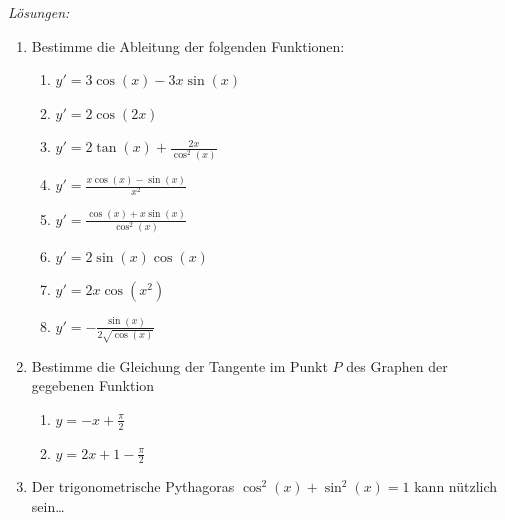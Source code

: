 \clearpage
\emph{Lösungen:}
\begin{enumerate}
	\item Bestimme die Ableitung der folgenden Funktionen:
	      \begin{enumerate}
		      \item $y' = 3\cos(x) - 3x\sin(x)$
		      \item $y' = 2\cos(2x)$
		      \item $y' = 2\tan(x) + \frac{2x}{\cos^2(x)}$
		      \item $y' = \frac{x\cos(x)-\sin(x)}{x^2}$
		      \item $y' = \frac{\cos(x)+x\sin(x)}{\cos^2(x)}$
		      \item $y' = 2\sin(x)\cos(x)$
		      \item $y' = 2x\cos(x^2)$
		      \item $y' = -\frac{\sin(x)}{2\sqrt{\cos(x)}}$
	      \end{enumerate}
	\item Bestimme die Gleichung der Tangente im Punkt $P$ des Graphen der gegebenen Funktion
	      \begin{enumerate}
		      \item $y= -x+\frac{\pi}{2}$
		      \item $y= 2x+1-\frac{\pi}{2}$
	      \end{enumerate}
	\item Der trigonometrische Pythagoras $\cos^2(x)+\sin^2(x) = 1$ kann nützlich sein\dots
\end{enumerate}






































\clearpage

